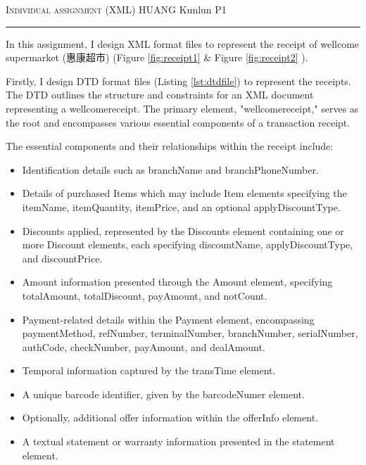 \documentclass[12pt]{amsart}
\begin{document}
\thispagestyle{empty}

 \hfill {\scshape \large Individual assignment (XML)} \hfill HUANG Kunlun \hfill {\scshape P1}
 
\smallskip

\hrule

\bigskip

In this assignment, I design XML format files to represent
the receipt of wellcome supermarket (惠康超市)  (Figure \ref{fig:receipt1} \& Figure \ref{fig:receipt2} ).

\bigskip

Firstly, I design DTD format files (Listing \ref{lst:dtdfile}) to represent the receipts.
The DTD outlines the structure and constraints for an XML document representing a wellcomereceipt. The primary element, "wellcomereceipt," serves as the root and encompasses various essential components of a transaction receipt.

The essential components and their relationships within the receipt include:
\begin{itemize}
    \item Identification details such as branchName and branchPhoneNumber.
    \item Details of purchased Items which may include Item elements specifying the itemName, itemQuantity, itemPrice, and an optional applyDiscountType.
    \item Discounts applied, represented by the Discounts element containing one or more Discount elements, each specifying discountName, applyDiscountType, and discountPrice.
    \item Amount information presented through the Amount element, specifying totalAmount, totalDiscount, payAmount, and notCount.
    \item Payment-related details within the Payment element, encompassing paymentMethod, refNumber, terminalNumber, branchNumber, serialNumber, authCode, checkNumber, payAmount, and dealAmount.
    \item Temporal information captured by the transTime element.
    \item A unique barcode identifier, given by the barcodeNumer element.
    \item Optionally, additional offer information within the offerInfo element.
    \item A textual statement or warranty information presented in the statement element.
\end{itemize}
\end{document}
